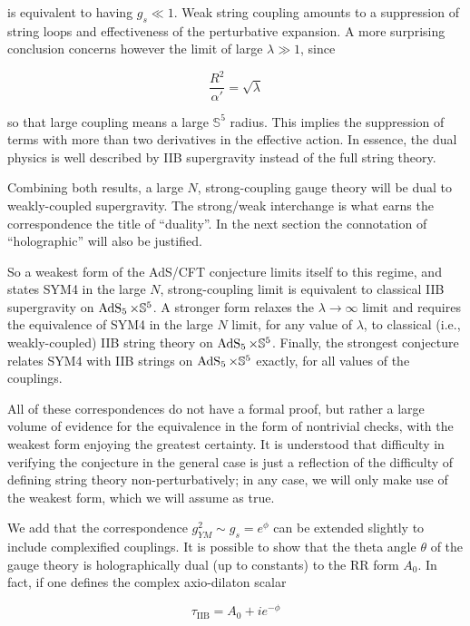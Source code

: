 is equivalent to having $g_s \ll 1$. Weak string coupling amounts to a suppression of string loops and effectiveness of the perturbative expansion. A more surprising conclusion concerns however the limit of large $\lambda \gg 1$, since

\begin{equation}
	\frac{R^2}{\alpha'} = \sqrt \lambda
	\label{}
\end{equation}

so that large coupling means a large $\mathbb{S}^5$ radius. This implies the suppression of terms with more than two derivatives in the effective action. In essence, the dual physics is well described by IIB supergravity instead of the full string theory.

Combining both results, a large $N$, strong-coupling gauge theory will be dual to weakly-coupled supergravity. The strong/weak interchange is what earns the correspondence the title of ``duality''. In the next section the connotation of ``holographic'' will also be justified.

So a weakest form of the AdS/CFT conjecture limits itself to this regime, and states SYM4 in the large $N$, strong-coupling limit is equivalent to classical IIB supergravity on $\operatorname{AdS}_{5} \times \mathbb{S}^5$. A stronger form relaxes the $\lambda \rightarrow \infty$ limit and requires the equivalence of SYM4 in the large $N$ limit, for any value of $\lambda$, to classical (i.e., weakly-coupled) IIB string theory on $\operatorname{AdS}_{5} \times \mathbb{S}^5$. Finally, the strongest conjecture relates SYM4 with IIB strings on $\operatorname{AdS}_{5}\times\mathbb{S}^5$ exactly, for all values of the couplings.

All of these correspondences do not have a formal proof, but rather a large volume of evidence for the equivalence in the form of nontrivial checks, with the weakest form enjoying the greatest certainty. It is understood that difficulty in verifying the conjecture in the general case is just a reflection of the difficulty of defining string theory non-perturbatively; in any case, we will only make use of the weakest form, which we will assume as true.

We add that the correspondence $g_{YM}^2 \sim g_s = e^\phi$ can be extended slightly to include complexified couplings. It is possible to show that the theta angle $\theta$ of the gauge theory is holographically dual (up to constants) to the RR form $A_0$. In fact, if one defines the complex axio-dilaton scalar

\begin{equation}
	\tau_\mathrm{IIB} = A_0 + ie^{-\phi}
	\label{}
\end{equation}

